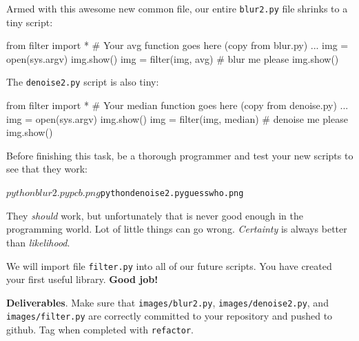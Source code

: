 Armed with this awesome new common file, our entire {\tt blur2.py} file shrinks to a tiny script:

\begin{pyverbatim}
from filter import *
# Your avg function goes here (copy from blur.py)
...
img = open(sys.argv)
img.show()
img = filter(img, avg)		# blur me please
img.show()
\end{pyverbatim}

\noindent The {\tt denoise2.py} script is also tiny:

\begin{pyverbatim}
from filter import *
# Your median function goes here (copy from denoise.py)
...
img = open(sys.argv)
img.show()
img = filter(img, median)	# denoise me please
img.show()
\end{pyverbatim}

\begin{callout}{\bctakecare}
Before finishing this task, be a thorough programmer and test your new scripts to see that they work:
\begin{alltt}
$ python blur2.py pcb.png
$ python denoise2.py guesswho.png
\end{alltt}
They {\em should} work, but unfortunately that is never good enough in the programming world.  Lot of little things can go wrong. {\em Certainty} is always better than {\em likelihood}.
\end{callout}

We will import file {\tt filter.py} into all of our future scripts. You have created your first useful library. {\bf Good job!} \scalebox{.55}{\bcsmbh}

\begin{callout}{\bcplume}
{\bf Deliverables}. Make sure that {\tt images/blur2.py}, {\tt images/denoise2.py}, and {\tt images/filter.py} are correctly committed to your repository and pushed to github. Tag when completed with {\tt refactor}.
\end{callout}

